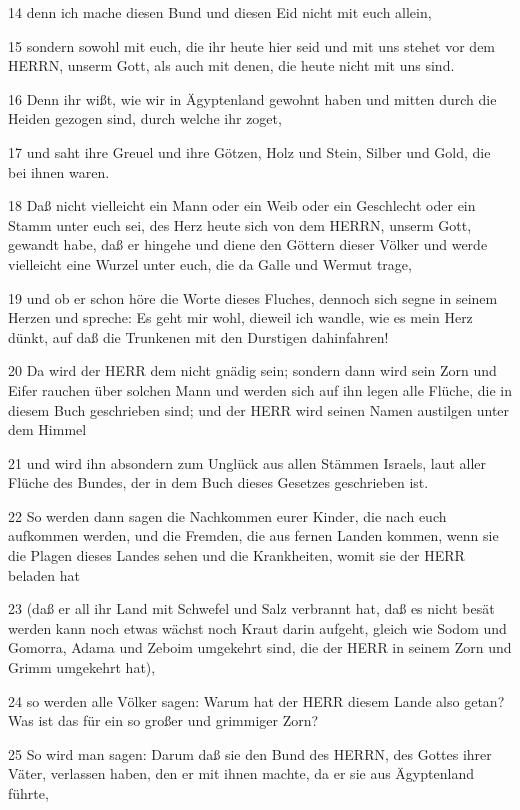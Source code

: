 \par 14 denn ich mache diesen Bund und diesen Eid nicht mit euch allein,
\par 15 sondern sowohl mit euch, die ihr heute hier seid und mit uns stehet vor dem HERRN, unserm Gott, als auch mit denen, die heute nicht mit uns sind.
\par 16 Denn ihr wißt, wie wir in Ägyptenland gewohnt haben und mitten durch die Heiden gezogen sind, durch welche ihr zoget,
\par 17 und saht ihre Greuel und ihre Götzen, Holz und Stein, Silber und Gold, die bei ihnen waren.
\par 18 Daß nicht vielleicht ein Mann oder ein Weib oder ein Geschlecht oder ein Stamm unter euch sei, des Herz heute sich von dem HERRN, unserm Gott, gewandt habe, daß er hingehe und diene den Göttern dieser Völker und werde vielleicht eine Wurzel unter euch, die da Galle und Wermut trage,
\par 19 und ob er schon höre die Worte dieses Fluches, dennoch sich segne in seinem Herzen und spreche: Es geht mir wohl, dieweil ich wandle, wie es mein Herz dünkt, auf daß die Trunkenen mit den Durstigen dahinfahren!
\par 20 Da wird der HERR dem nicht gnädig sein; sondern dann wird sein Zorn und Eifer rauchen über solchen Mann und werden sich auf ihn legen alle Flüche, die in diesem Buch geschrieben sind; und der HERR wird seinen Namen austilgen unter dem Himmel
\par 21 und wird ihn absondern zum Unglück aus allen Stämmen Israels, laut aller Flüche des Bundes, der in dem Buch dieses Gesetzes geschrieben ist.
\par 22 So werden dann sagen die Nachkommen eurer Kinder, die nach euch aufkommen werden, und die Fremden, die aus fernen Landen kommen, wenn sie die Plagen dieses Landes sehen und die Krankheiten, womit sie der HERR beladen hat
\par 23 (daß er all ihr Land mit Schwefel und Salz verbrannt hat, daß es nicht besät werden kann noch etwas wächst noch Kraut darin aufgeht, gleich wie Sodom und Gomorra, Adama und Zeboim umgekehrt sind, die der HERR in seinem Zorn und Grimm umgekehrt hat),
\par 24 so werden alle Völker sagen: Warum hat der HERR diesem Lande also getan? Was ist das für ein so großer und grimmiger Zorn?
\par 25 So wird man sagen: Darum daß sie den Bund des HERRN, des Gottes ihrer Väter, verlassen haben, den er mit ihnen machte, da er sie aus Ägyptenland führte,
